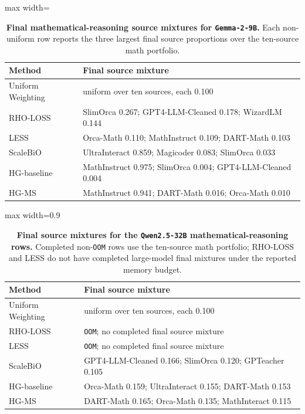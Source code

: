 \documentclass{article}
\theoremstyle{normaltheorem}
\begin{document}
\begin{table}[t]
  \centering
  \caption{\textbf{Final mathematical-reasoning source mixtures for \texttt{Gemma-2-9B}.}
  Each non-uniform row reports the three largest final source proportions over the ten-source math portfolio.}
  \label{tab:llm-main-math-mixtures-gemma}
  \small
  \begin{adjustbox}{max width=\textwidth}
  \begin{tabular}{ll}
    \toprule
    Method & Final source mixture \\
    \midrule
    Uniform Weighting & uniform over ten sources, each 0.100 \\
    RHO-LOSS & SlimOrca 0.267; GPT4-LLM-Cleaned 0.178; WizardLM 0.144 \\
    LESS & Orca-Math 0.110; MathInstruct 0.109; DART-Math 0.103 \\
    ScaleBiO & UltraInteract 0.859; Magicoder 0.083; SlimOrca 0.033 \\
    HG-baseline & MathInstruct 0.975; SlimOrca 0.004; GPT4-LLM-Cleaned 0.004 \\
    HG-MS & MathInstruct 0.941; DART-Math 0.016; Orca-Math 0.010 \\
    \bottomrule
  \end{tabular}
  \end{adjustbox}
\end{table}

\begin{table}[t]
  \centering
  \caption{\textbf{Final source mixtures for the \texttt{Qwen2.5-32B} mathematical-reasoning rows.}
  Completed non-\texttt{OOM} rows use the ten-source math portfolio; \textsc{RHO-LOSS} and \textsc{LESS} do not have completed large-model final mixtures under the reported memory budget.}
  \label{tab:llm-large-math-mixtures}
  \begin{adjustbox}{max width=0.9\textwidth}
  \begin{tabular}{ll}
    \toprule
    Method & Final source mixture \\
    \midrule
    Uniform Weighting & uniform over ten sources, each 0.100 \\
    RHO-LOSS & \texttt{OOM}; no completed final source mixture \\
    LESS & \texttt{OOM}; no completed final source mixture \\
    ScaleBiO & GPT4-LLM-Cleaned 0.166; SlimOrca 0.120; GPTeacher 0.105 \\
    HG-baseline & Orca-Math 0.159; UltraInteract 0.155; DART-Math 0.153 \\
    HG-MS & DART-Math 0.165; Orca-Math 0.135; MathInteract 0.115 \\
    \bottomrule
  \end{tabular}
  \end{adjustbox}
\end{table}
\end{document}
